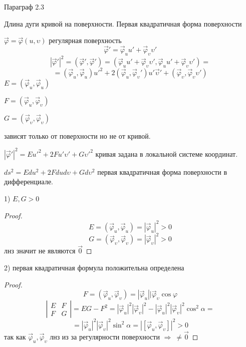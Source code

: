 \begin{title}[\Large]
  Параграф 2.3
\end{title}

\begin{title}[\Large]
  Длина дуги кривой на поверхности. Первая квадратичная форма поверхности
\end{title}

\begin{define}
  $\vec \varphi = \vec \varphi(u, \upsilon)$ регулярная поверхность
  $$
  \vec \varphi' = \vec \varphi_u u' + \vec \varphi_{\upsilon} \upsilon'
  $$
  $$
  |\vec \varphi'|^2 = (\vec \varphi', \vec \varphi') =
  (\vec \varphi_u u' + \vec \varphi_{\upsilon} \upsilon',
  \vec \varphi_u u' + \vec \varphi_{\upsilon} \upsilon') =
  $$
  $$
  = (\vec \varphi_u, \vec \varphi_u)u'^2 + 2(\vec \varphi_u,
  \vec \varphi_{\upsilon}') u' \vec \upsilon' + (\vec \varphi_{\upsilon},
  \vec \varphi_{\upsilon} \upsilon')
  $$
  $E = (\vec \varphi_u, \vec \varphi_u)$

  $F = (\vec \varphi_u, \vec \varphi_{\upsilon})$

  $G = (\vec \varphi_{\upsilon}, \vec \varphi_{\upsilon})$

  зависят только от поверхности но не от кривой.

  $|\vec \varphi'|^2 = E u'^2 + 2Fu'\upsilon' + G\upsilon'^2$ кривая задана в
  локальной системе координат.

  $ds^2 = Edu^2 + 2Fdud\upsilon + Gd\upsilon^2$ первая квадратичная форма
  поверхности в дифференциале.
\end{define}

\begin{block}[Свойства]
  1) $E,G > 0$

  \begin{proof}
    $$
    E = (\vec \varphi_u, \vec \varphi_u) = |\vec \varphi_u|^2 > 0
    $$
    $$
    G = (\vec \varphi_{\upsilon}, \vec \varphi_{\upsilon}) =
    |\vec \varphi_{\upsilon}|^2 > 0
    $$
    лнз значит не являются $\vec 0$
  \end{proof}

  2) первая квадратичная формула положительна определена

  \begin{proof}
    $$
    F = (\vec \varphi_u, \vec \varphi_{\upsilon}) = |\vec \varphi_u|
    |\vec \varphi_{\upsilon} \cos \varphi
    $$
    $$
    \left|
    \begin{array}{cc}
      E & F \\
      F & G
    \end{array}
    \right|
    = EG - F^2 = |\vec \varphi_u|^2|\vec \varphi_{\upsilon}|^2 -
    |\vec \varphi_u|^2 |\vec \varphi_{\upsilon}|^2 \cos^2 \alpha =
    $$
    $$
    = |\vec \varphi_u|^2
    |\vec \varphi_{\upsilon}|^2 \sin^2 \alpha = |[\vec \varphi_u, \vec
    \varphi_{\upsilon}]|^2 > 0
    $$
    так как $\vec \varphi_u, \vec \varphi_{\upsilon}$ лнз из за регулярности
    поверхности $\Rightarrow ~ \not= \vec 0$
  \end{proof}
\end{block}

